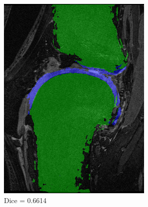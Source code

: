 \documentclass[a4paper,12pt]{article}
\begin{document}
\begin{figure}[H]
    \centering

    \begin{subfigure}[b]{0.32\linewidth}
    \includegraphics[width=\linewidth]{final_SPBM_worst.png}
    \caption{Dice = 0.6614}
    \end{subfigure}
    \begin{subfigure}[b]{0.32\linewidth}

\end{subfigure}
\end{figure}
\end{document}

